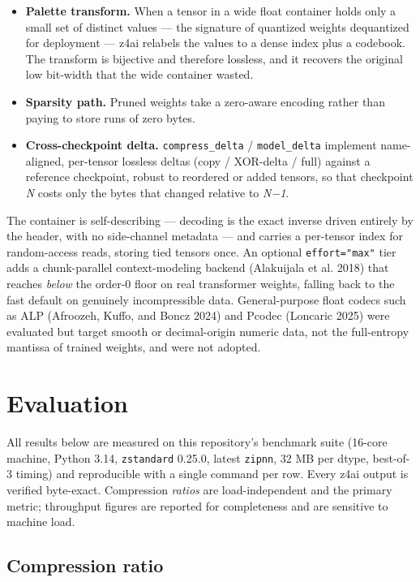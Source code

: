 \documentclass[
]{article}
\providecommand{\tightlist}{%
  \setlength{\itemsep}{0pt}\setlength{\parskip}{0pt}}
\begin{document}
\begin{itemize}
\tightlist
\item
  \textbf{Palette transform.} When a tensor in a wide float container
  holds only a small set of distinct values --- the signature of
  quantized weights dequantized for deployment --- z4ai relabels the
  values to a dense index plus a codebook. The transform is bijective
  and therefore lossless, and it recovers the original low bit-width
  that the wide container wasted.
\item
  \textbf{Sparsity path.} Pruned weights take a zero-aware encoding
  rather than paying to store runs of zero bytes.
\item
  \textbf{Cross-checkpoint delta.} \texttt{compress\_delta} /
  \texttt{model\_delta} implement name-aligned, per-tensor lossless
  deltas (copy / XOR-delta / full) against a reference checkpoint,
  robust to reordered or added tensors, so that checkpoint \emph{N}
  costs only the bytes that changed relative to \emph{N−1}.
\end{itemize}

The container is self-describing --- decoding is the exact inverse
driven entirely by the header, with no side-channel metadata --- and
carries a per-tensor index for random-access reads, storing tied tensors
once. An optional \texttt{effort="max"} tier adds a chunk-parallel
context-modeling backend (Alakuijala et al. 2018) that reaches
\emph{below} the order-0 floor on real transformer weights, falling back
to the fast default on genuinely incompressible data. General-purpose
float codecs such as ALP (Afroozeh, Kuffo, and Boncz 2024) and Pcodec
(Loncaric 2025) were evaluated but target smooth or decimal-origin
numeric data, not the full-entropy mantissa of trained weights, and were
not adopted.

\section{Evaluation}\label{evaluation}

All results below are measured on this repository's benchmark suite
(16-core machine, Python 3.14, \texttt{zstandard} 0.25.0, latest
\texttt{zipnn}, 32 MB per dtype, best-of-3 timing) and reproducible with
a single command per row. Every z4ai output is verified byte-exact.
Compression \emph{ratios} are load-independent and the primary metric;
throughput figures are reported for completeness and are sensitive to
machine load.

\subsection{Compression ratio}\label{compression-ratio}
\end{document}
